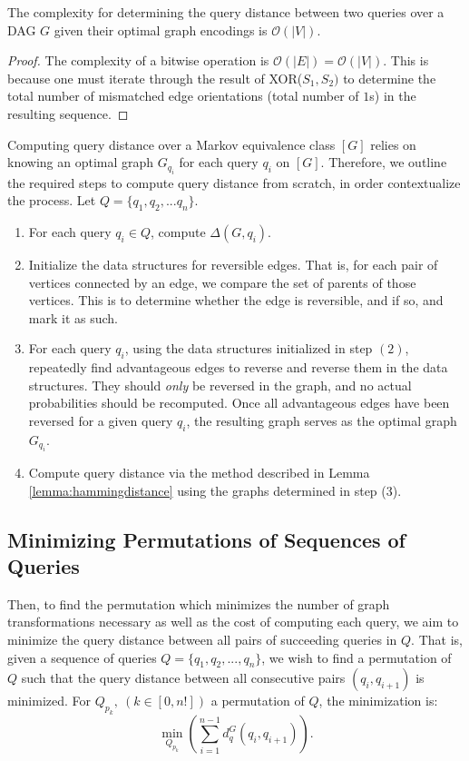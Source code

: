 \begin{lemma} The complexity for determining the query distance between two queries over a DAG $G$ given their optimal graph encodings is $\mathcal{O}(|V|)$.
\end{lemma}

\begin{proof}
The complexity of a bitwise operation is $\mathcal{O}(|E|) = \mathcal{O}(|V|)$. This is because one must iterate through the result of \textsc{XOR}($S_{1},S_{2})$ to determine the total number of mismatched edge orientations (total number of $1$s) in the resulting sequence.
\end{proof}

\null \quad \quad Computing query distance over a Markov equivalence class $[G]$ relies on knowing an optimal graph $G_{q_{i}}$ for each query $q_{i}$ on $[G]$. Therefore, we outline the required steps to compute query distance from scratch, in order contextualize the process. Let $Q = \{q_{1}, q_{2},... q_{n}\}$.
\begin{enumerate}
\item For each query $q_{i} \in Q$, compute $\Delta(G,q_{i})$.
\item Initialize the data structures for reversible edges. That is, for each pair of vertices connected by an edge, we compare the set of parents of those vertices. This is to determine whether the edge is reversible, and if so, and mark it as such. 
\item For each query $q_{i}$, using the data structures initialized in step $(2)$, repeatedly find advantageous edges to reverse and reverse them in the data structures. They should \textit{only} be reversed in the graph, and no actual probabilities should be recomputed. Once all advantageous edges have been reversed for a given query $q_{i}$, the resulting graph serves as the optimal graph $G_{q_{i}}$.
\item Compute query distance via the method described in Lemma \ref{lemma:hammingdistance} using the graphs determined in step (3). 
\end{enumerate}

\subsection{Minimizing Permutations of Sequences of Queries}

\null \quad \quad Then, to find the permutation which minimizes the number of graph transformations necessary as well as the cost of computing each query, we aim to minimize the query distance between all pairs of succeeding queries in $Q$. That is, given a sequence of queries $Q = \{q_{1}, q_{2}, ..., q_{n}\}$, we wish to find a permutation of $Q$ such that the query distance between all consecutive pairs $(q_{i}, q_{i+1})$ is minimized. For $Q_{p_{k}},\ (k \in [0, n!])$ a permutation of $Q$, the minimization is:
$$\min_{Q_{p_{k}}}(\sum_{i=1}^{n-1}d_{q}^{G}(q_{i},q_{i+1})).$$

